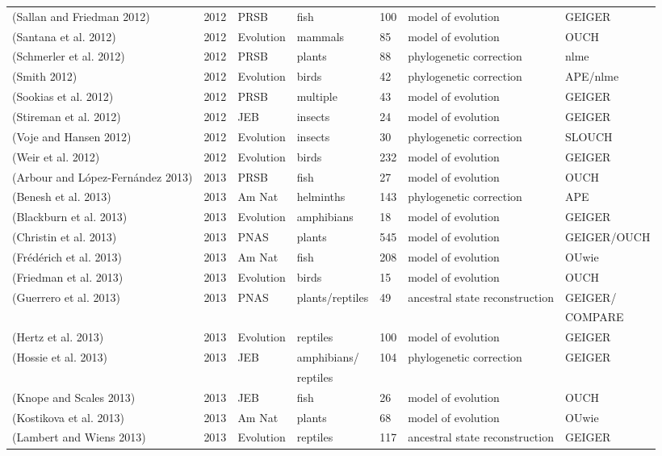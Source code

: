 \begin{longtable}{p{6cm}llllll}
(Sallan and Friedman 2012)	&	2012	&	PRSB	&	fish	&	100	&	model of evolution	&	GEIGER	\\
(Santana et al. 2012)	&	2012	&	Evolution	&	mammals	&	85	&	model of evolution	&	OUCH	\\
(Schmerler et al. 2012)	&	2012	&	PRSB	&	plants	&	88	&	phylogenetic correction	&	nlme	\\
(Smith 2012)	&	2012	&	Evolution	&	birds	&	42	&	phylogenetic correction	&	APE/nlme	\\
(Sookias et al. 2012)	&	2012	&	PRSB	&	multiple	&	43	&	model of evolution	&	GEIGER	\\
(Stireman et al. 2012)	&	2012	&	JEB	&	insects	&	24	&	model of evolution	&	GEIGER	\\
(Voje and Hansen 2012)	&	2012	&	Evolution	&	insects	&	30	&	phylogenetic correction	&	SLOUCH	\\
(Weir et al. 2012)	&	2012	&	Evolution	&	birds	&	232	&	model of evolution	&	GEIGER	\\
(Arbour and López-Fernández 2013)	&	2013	&	PRSB	&	fish	&	27	&	model of evolution	&	OUCH	\\
(Benesh et al. 2013)	&	2013	&	Am Nat	&	helminths	&	143	&	phylogenetic correction	&	APE	\\
(Blackburn et al. 2013)	&	2013	&	Evolution	&	amphibians	&	18	&	model of evolution	&	GEIGER	\\
(Christin et al. 2013)	&	2013	&	PNAS	&	plants	&	545	&	model of evolution	&	GEIGER/OUCH	\\
(Frédérich et al. 2013)	&	2013	&	Am Nat	&	fish	&	208	&	model of evolution	&	OUwie	\\
(Friedman et al. 2013)	&	2013	&	Evolution	&	birds	&	15	&	model of evolution	&	OUCH	\\
(Guerrero et al. 2013)	&	2013	&	PNAS	&	plants/reptiles	&	49	&	ancestral state reconstruction	&	GEIGER/	\\
	&		&		&		&		&		&	COMPARE	\\
(Hertz et al. 2013)	&	2013	&	Evolution	&	reptiles	&	100	&	model of evolution	&	GEIGER	\\
(Hossie et al. 2013)	&	2013	&	JEB	&	amphibians/	&	104	&	phylogenetic correction	&	GEIGER	\\
	&		&		&	reptiles	&		&		&		\\
(Knope and Scales 2013)	&	2013	&	JEB	&	fish	&	26	&	model of evolution	&	OUCH	\\
(Kostikova et al. 2013)	&	2013	&	Am Nat	&	plants	&	68	&	model of evolution	&	OUwie	\\
(Lambert and Wiens 2013)	&	2013	&	Evolution	&	reptiles	&	117	&	ancestral state reconstruction	&	GEIGER	\\

\end{longtable}
